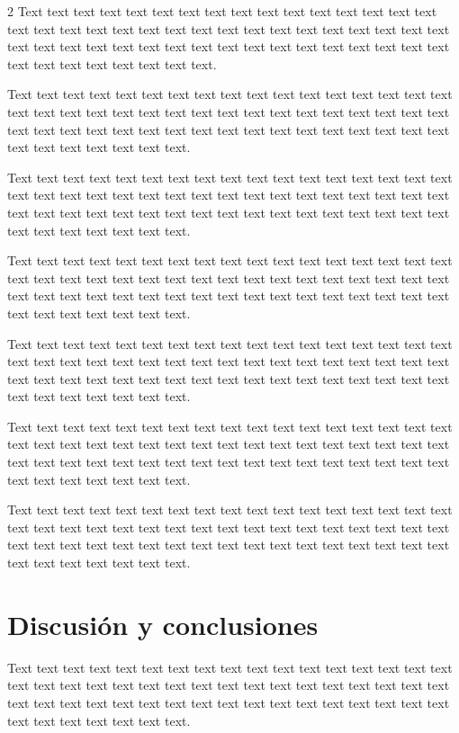 \documentclass[12pt,twoside]{apa7}
\begin{document}
\begin{multicols}{2}
Text text text text text text text text text text text text text text text text text text text text text text text text text text text text text text text text text text text text text text text text text text text text text text text text text text text text text text text text text text.

Text text text text text text text text text text text text text text text text text text text text text text text text text text text text text text text text text text text text text text text text text text text text text text text text text text text text text text text text text text.

Text text text text text text text text text text text text text text text text text text text text text text text text text text text text text text text text text text text text text text text text text text text text text text text text text text text text text text text text text text.

Text text text text text text text text text text text text text text text text text text text text text text text text text text text text text text text text text text text text text text text text text text text text text text text text text text text text text text text text text text.

Text text text text text text text text text text text text text text text text text text text text text text text text text text text text text text text text text text text text text text text text text text text text text text text text text text text text text text text text text text.

Text text text text text text text text text text text text text text text text text text text text text text text text text text text text text text text text text text text text text text text text text text text text text text text text text text text text text text text text text text.

Text text text text text text text text text text text text text text text text text text text text text text text text text text text text text text text text text text text text text text text text text text text text text text text text text text text text text text text text text text.

\section{Discusión y conclusiones}
Text text text text text text text text text text text text text text text text text text text text text text text text text text text text text text text text text text text text text text text text text text text text text text text text text text text text text text text text text text.


\end{multicols}
\end{document}
